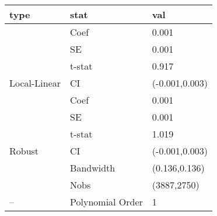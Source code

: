 
\begin{tabular}{lll}
\toprule
type & stat & val\\
\midrule
 & Coef & 0.001\\

 & SE & 0.001\\

 & t-stat & 0.917\\

\multirow{-4}{*}{\raggedright\arraybackslash Local-Linear} & CI & (-0.001,0.003)\\
\cmidrule{1-3}
 & Coef & 0.001\\

 & SE & 0.001\\

 & t-stat & 1.019\\

\multirow{-4}{*}{\raggedright\arraybackslash Robust} & CI & (-0.001,0.003)\\
\cmidrule{1-3}
 & Bandwidth & (0.136,0.136)\\

 & Nobs & (3887,2750)\\

\multirow{-3}{*}{\raggedright\arraybackslash --} & Polynomial Order & 1\\
\bottomrule
\end{tabular}